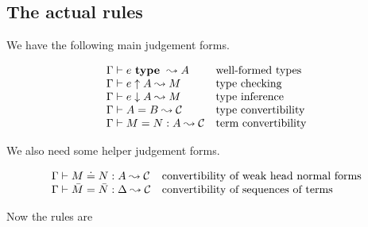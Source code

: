 

\subsection{The actual rules}

We have the following main judgement forms.

\[\begin{array}{ll}
    {\Gamma} \vdash {e} ~ \mathbf{type} ~ \leadsto {A} & \mbox{well-formed types} \\
    {\Gamma} \vdash {e} \uparrow {A} \leadsto {M} & \mbox{type checking} \\
    {\Gamma} \vdash {e} \downarrow {A} \leadsto {M} & \mbox{type inference} \\
    {\Gamma} \vdash {A} = {B} \leadsto {\mathcal{C}} & \mbox{type convertibility} \\
    {\Gamma} \vdash {M} = {N} : {A} \leadsto {\mathcal{C}} & \mbox{term convertibility} \\
\end{array}\]

We also need some helper judgement forms.

\[\begin{array}{ll}
    {\Gamma} \vdash {M} \doteq {N} : {A} \leadsto {\mathcal{C}} & \mbox{convertibility of weak head normal forms} \\
    {\Gamma} \vdash {\bar M} = {\bar N} : {\Delta} \leadsto {\mathcal{C}} & \mbox{convertibility of sequences of terms} \\
\end{array}\]

Now the rules are



